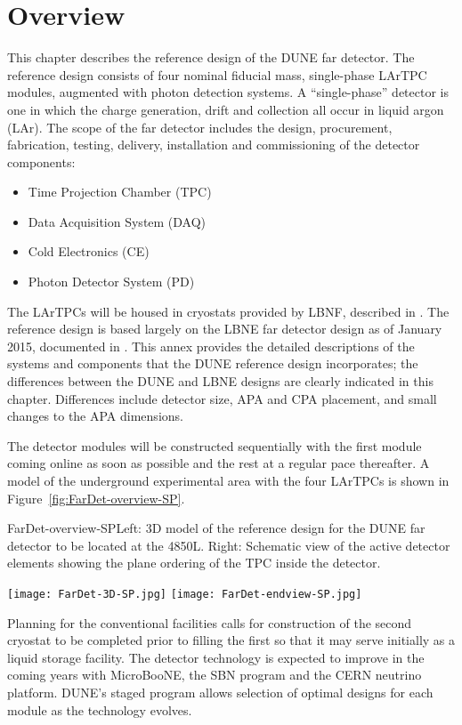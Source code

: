 \section{Overview}
\label{sec:detectors-fd-ref-ov}


This chapter describes the reference design of the DUNE far detector.
The reference design consists of four nominal  fiducial
mass, single-phase LArTPC modules, augmented with photon detection
systems.  A ``single-phase'' detector is one in which the charge
generation, drift and collection all occur in liquid argon (LAr). The
scope of the far detector includes the design, procurement,
fabrication, testing, delivery, installation and commissioning of the
detector components:
\begin{itemize}
\item Time Projection Chamber (TPC)
\item Data Acquisition System (DAQ)  
\item Cold Electronics (CE)
\item Photon Detector System (PD)
\end{itemize}
The LArTPCs will be housed in cryostats provided by LBNF, described in
\vollbnf. The reference design is based largely on the LBNE far
detector design as of January 2015, documented in \anxlbnefd. This
annex provides the detailed descriptions of the systems and components
that the DUNE reference design incorporates; the differences between
the DUNE and LBNE designs are clearly indicated in this
chapter. Differences include detector size, APA and CPA
placement, and small changes to the APA dimensions.

The detector modules will be constructed sequentially
with the first module coming online as soon as possible and the rest
at a regular pace thereafter. A model of the underground experimental area with
the four  LArTPCs is shown in
Figure~\ref{fig:FarDet-overview-SP}. 
\begin{cdrfigure}{FarDet-overview-SP}{Left: 3D model of the reference design for the DUNE far detector to be located at the 4850L. Right: Schematic view of the active detector elements showing the plane ordering of the TPC inside the detector.}
\centering
\begin{minipage}[b]{1.0\textwidth}
\begin{center}
\texttt{[image: FarDet-3D-SP.jpg]}
\texttt{[image: FarDet-endview-SP.jpg]}
\end{center}
\end{minipage}
\end{cdrfigure}
Planning for the conventional facilities calls for construction of the
second cryostat to be completed prior to filling the first so that it
may serve initially as a liquid storage facility.  The detector
technology is expected to improve in the coming years with MicroBooNE,
the SBN program and the CERN neutrino platform.  DUNE's staged program
allows selection of optimal designs for each module as the technology
evolves.


